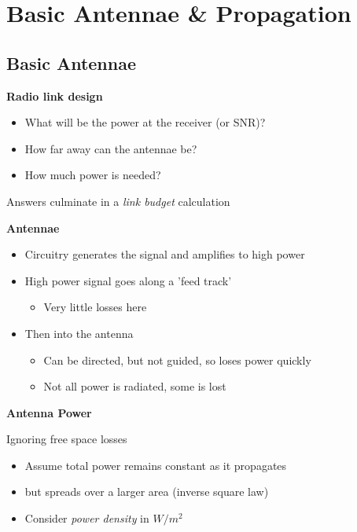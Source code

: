 \documentclass[12pt]{article}
\begin{document}
\section{Basic Antennae \& Propagation}
\subsection{Basic Antennae}
\textbf{Radio link design}
\begin{itemize}[noitemsep]
    \item What will be the power at the receiver (or SNR)?
    \item How far away can the antennae be?
    \item How much power is needed?
\end{itemize}
Answers culminate in a \textit{link budget} calculation

\textbf{Antennae}
\begin{itemize}[noitemsep]
    \item Circuitry generates the signal and amplifies to high power
    \item High power signal goes along a 'feed track'
    \begin{itemize}[noitemsep]
        \item Very little losses here
    \end{itemize}
    \item Then into the antenna
    \begin{itemize}[noitemsep]
        \item Can be directed, but not guided, so loses power quickly
        \item Not all power is radiated, some is lost
    \end{itemize}
\end{itemize}

\begin{flushright}[Lecture on 1.5]\end{flushright}

\textbf{Antenna Power}

Ignoring free space losses
\begin{itemize}[noitemsep]
    \item Assume total power remains constant as it propagates
    \item but spreads over a larger area (inverse square law)
    \item Consider \textit{power density} in $W/m^2$
\end{itemize}
\end{document}
